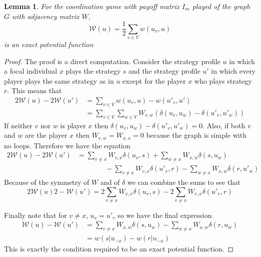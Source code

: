 \documentclass{article}
\newtheorem{lemma}{Lemma}[section]
\begin{document}
\begin{lemma}\label{lem:potentialFunction}
    For the coordination game with payoff matrix $I_m$ played of the graph $G$ with adjacency matrix $W$, \[\mathcal{W}(u)=\frac{1}{2}\sum_{v\in V}w(u_v,u)\] is an exact potential function
\end{lemma}
\begin{proof}
    The proof is a direct computation. Consider the strategy profile $u$ in which a focal individual $x$ plays the strategy $s$ and the strategy profile $u'$ in which every player plays the same strategy as in $u$ except for the player $x$ who plays strategy $r$. This means that 
    \begin{equation*}
        \begin{split}
            2\mathcal{W}(u)-2\mathcal{W}(u')&=\sum_{v\in V}w(u_v,u)-w(u'_v,u')\\
            &=\sum_{v\in V}\sum_{w\in V}W_{v,w}(\delta(u_v,u_w)-\delta(u'_v,u'_w))
        \end{split}
    \end{equation*}
    If neither $v$ nor $w$ is player $x$ then $\delta(u_v,u_w)-\delta(u'_v,u'_w)=0$. Also, if both $v$ and $w$ are the player $x$ then $W_{v,w}=W_{x,x}=0$ because the graph is simple with no loops. Therefore we have the equation
    \begin{equation*}
        \begin{split}
            2\mathcal{W}(u)-2\mathcal{W}(u')&=\sum_{v\neq x}W_{v,x}\delta(u_v,s)+\sum_{w\neq x} W_{x,w}\delta (s,u_w)\\
            &\quad\quad\quad\quad-\sum_{v\neq x}W_{v,x}\delta(u'_v,r)-\sum_{w\neq x} W_{x,w}\delta (r,u'_w)
        \end{split}
    \end{equation*}
    Because of the symmetry of $W$ and of $\delta$ we can combine the sums to see that 
    \[2\mathcal{W}(u)2-\mathcal{W}(u')=2\sum_{v\neq x}W_{v,x}\delta(u_v,s)-2\sum_{v\neq x}W_{v,x}\delta(u'_v,r)\]

    Finally note that for $v\neq x$, $u_v=u'_v$ so we have the final expression
    \begin{equation*}
        \begin{split}\mathcal{W}(u)-\mathcal{W}(u')&=\sum_{v\neq x}W_{x,w}\delta(s,u_w)-\sum_{w\neq x} W_{x,w}\delta (r,u_w)\\
        &= w(s|u_{-x})-w(r|u_{-x})
        \end{split}
    \end{equation*}
    This is exactly the condition required to be an exact potential function. 
\end{proof}
\end{document}
